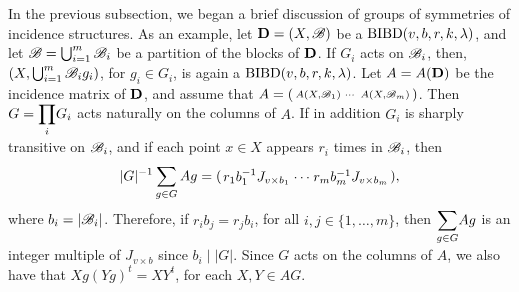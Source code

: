 \documentclass[../../../main]{subfiles}
\begin{document}
In the previous subsection, we began a brief discussion of groups of symmetries
of incidence structures. As an example, let $\mathbf{D}=(X,\mathscr{B})$ be a
$\text{BIBD}(v,b,r,k,\lambda)$, and let $\mathscr{B} = \bigcup_{i=1}^m \mathscr{B}_i$ be a partition of
the blocks of $\mathbf{D}$. If $G_i$ acts on $\mathscr{B}_i$, then, $(X,\bigcup_{i=1}^m\mathscr{B}_ig_i)$,
for $g_i \in G_i$, is again a $\text{BIBD}(v,b,r,k,\lambda)$. Let $A=A(\mathbf{D})$ be the
incidence matrix of $\mathbf{D}$, and assume that $A = \left(\begin{smallmatrix}
                                                       A(X,\mathscr{B}_1) & \cdots & 
                                                                            A(X,\mathscr{B}_m) \end{smallmatrix}\right)$.
                                                                        Then
                                                                        $G=\pprod_iG_i$
                                                                        acts
                                                                        naturally
                                                                        on the
                                                                        columns
                                                                        of $A$.
                                                                        If in
                                                                        addition
                                                                        $G_i$ is
                                                                        sharply
                                                                        transitive
                                                                        on
                                                                        $\mathscr{B}_i$,
                                                                        and if
                                                                        each
                                                                        point $x
                                                                        \in X$
                                                                        appears
                                                                        $r_i$
                                                                        times in
                                                                        $\mathscr{B}_i$,
                                                                        then   
 \[
 \arraycolsep=1.25pt\def\arraystretch{0.625}
 \abs{G}^{-1}\sum_{g \in G}Ag = (\begin{array}{ccc} r_1b_1^{-1}J_{v \times b_1} & \cdots & r_mb_m^{-1}J_{v \times b_m} \end{array}),
 \]
 where $b_i=|\mathscr{B}_i|$. Therefore, if $r_ib_j=r_jb_i$, for all $i,j \in \{1,\dots,m\}$, then $\ssum_{g \in G}Ag$ is an integer multiple of $J_{v \times b}$ since $b_i \mid |G|$. Since $G$ acts on the columns of $A$, we also have that $Xg(Yg)^t = XY^t$, for each $X,Y \in AG$. 
 
\end{document}
